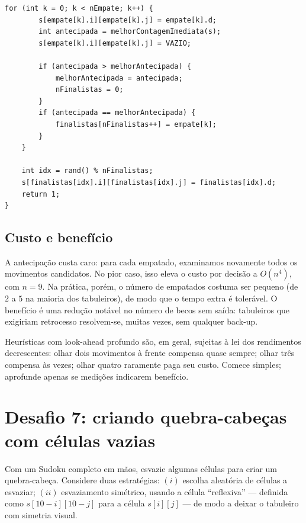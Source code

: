 \documentclass[11pt,a4paper,oneside]{report}
\begin{document}
\begin{lstlisting}[caption={Heurística com antecipação de uma jogada.},label={lst:lookahead}]
    for (int k = 0; k < nEmpate; k++) {
        s[empate[k].i][empate[k].j] = empate[k].d;
        int antecipada = melhorContagemImediata(s);
        s[empate[k].i][empate[k].j] = VAZIO;

        if (antecipada > melhorAntecipada) {
            melhorAntecipada = antecipada;
            nFinalistas = 0;
        }
        if (antecipada == melhorAntecipada) {
            finalistas[nFinalistas++] = empate[k];
        }
    }

    int idx = rand() % nFinalistas;
    s[finalistas[idx].i][finalistas[idx].j] = finalistas[idx].d;
    return 1;
}
\end{lstlisting}

\subsection{Custo e benefício}

A antecipação custa caro: para cada empatado, examinamos novamente
todos os movimentos candidatos. No pior caso, isso eleva o custo por
decisão a $O(n^4)$, com $n = 9$. Na prática, porém, o número de empatados
costuma ser pequeno (de $2$ a $5$ na maioria dos tabuleiros), de modo que
o tempo extra é tolerável. O benefício é uma redução notável no número
de becos sem saída: tabuleiros que exigiriam retrocesso resolvem-se,
muitas vezes, sem qualquer back-up.

\begin{boapratica}
Heurísticas com look-ahead profundo são, em geral, sujeitas à lei dos
rendimentos decrescentes: olhar dois movimentos à frente compensa quase
sempre; olhar três compensa às vezes; olhar quatro raramente paga seu
custo. Comece simples; aprofunde apenas se medições indicarem benefício.
\end{boapratica}

\section{Desafio 7: criando quebra-cabeças com células vazias}

\begin{enunciado}
Com um Sudoku completo em mãos, esvazie algumas células para criar um
quebra-cabeça. Considere duas estratégias: $(i)$ escolha aleatória de
células a esvaziar; $(ii)$ esvaziamento simétrico, usando a célula
``reflexiva'' --- definida como $s[10 - i][10 - j]$ para a célula
$s[i][j]$ --- de modo a deixar o tabuleiro com simetria visual.
\end{enunciado}
\end{document}
